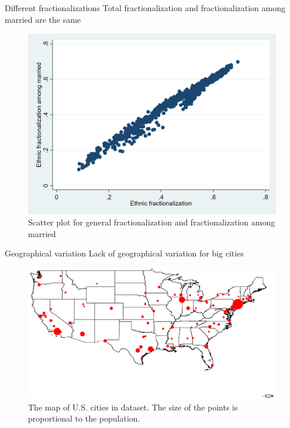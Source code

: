 \documentclass[c]{beamer}  %
\begin{document}
    \begin{frame}{Different fractionalizations}
    Total fractionalization and fractionalization among married are the same
    \begin{figure}[h]
        \centering
        \includegraphics[scale = 0.2]{Thesis/Figures/frac-frac.png}
        \caption{Scatter plot for general fractionalization and fractionalization among married}
        \label{fig:frac-frac}
    \end{figure}
    \end{frame}
    
    \begin{frame}{Geographical variation}
    Lack of geographical variation for big cities
    \begin{figure}[h]
        \centering
        \includegraphics[scale = 0.2]{Thesis/Maps/city_population.png}
        \caption{The map of U.S. cities in dataset. The size of the points is proportional to the population.}
        \label{fig:frac-frac}
    \end{figure}
    \end{frame}
    
\end{document}
